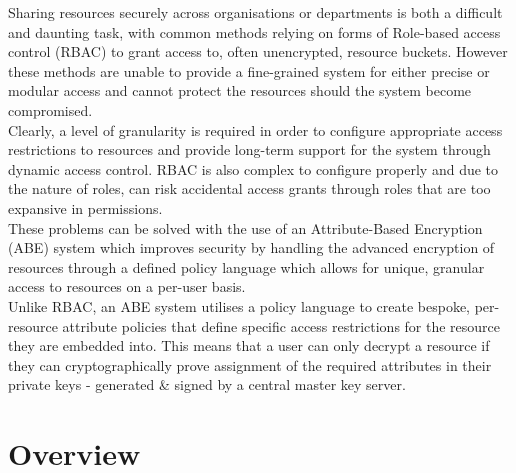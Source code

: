 Sharing resources securely across organisations or departments is both a difficult and daunting task, with common methods relying on forms of Role-based access control (RBAC) to grant access to, often unencrypted, resource buckets. However these methods are unable to provide a fine-grained system for either precise or modular access and cannot protect the resources should the system become compromised.\\
Clearly, a level of granularity is required in order to configure appropriate access restrictions to resources and provide long-term support for the system through dynamic access control. RBAC is also complex to configure properly and due to the nature of roles, can risk accidental access grants through roles that are too expansive in permissions.\\
These problems can be solved with the use of an Attribute-Based Encryption (ABE) system which improves security by handling the advanced encryption of resources through a defined policy language which allows for unique, granular access to resources on a per-user basis.\\
Unlike RBAC, an ABE system utilises a policy language to create bespoke, per-resource attribute policies that define specific access restrictions for the resource they are embedded into. This means that a user can only decrypt a resource if they can cryptographically prove assignment of the required attributes in their private keys - generated \& signed by a central master key server.

\section{Overview}
\label{sec:intro_overview}

